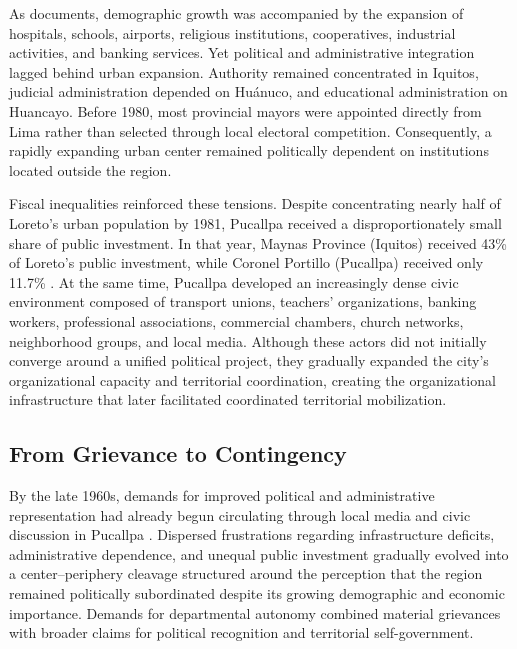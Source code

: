 \documentclass[12pt]{article}
\begin{document}
As \textcite{vivanco_pimentel_gran_1997} documents, demographic growth was accompanied by the expansion of hospitals, schools, airports, religious institutions, cooperatives, industrial activities, and banking services. Yet political and administrative integration lagged behind urban expansion. Authority remained concentrated in Iquitos, judicial administration depended on Huánuco, and educational administration on Huancayo. Before 1980, most provincial mayors were appointed directly from Lima rather than selected through local electoral competition. Consequently, a rapidly expanding urban center remained politically dependent on institutions located outside the region.

Fiscal inequalities reinforced these tensions. Despite concentrating nearly half of Loreto’s urban population by 1981, Pucallpa received a disproportionately small share of public investment. In that year, Maynas Province (Iquitos) received 43\% of Loreto’s public investment, while Coronel Portillo (Pucallpa) received only 11.7\% \parencite{vivanco_pimentel_gran_1997}. At the same time, Pucallpa developed an increasingly dense civic environment composed of transport unions, teachers’ organizations, banking workers, professional associations, commercial chambers, church networks, neighborhood groups, and local media. Although these actors did not initially converge around a unified political project, they gradually expanded the city’s organizational capacity and territorial coordination, creating the organizational infrastructure that later facilitated coordinated territorial mobilization.

\subsection{From Grievance to Contingency}\label{cleavage}

By the late 1960s, demands for improved political and administrative representation had already begun circulating through local media and civic discussion in Pucallpa \parencite{matos_tuesta_apuntes_2005}. Dispersed frustrations regarding infrastructure deficits, administrative dependence, and unequal public investment gradually evolved into a center--periphery cleavage structured around the perception that the region remained politically subordinated despite its growing demographic and economic importance. Demands for departmental autonomy combined material grievances with broader claims for political recognition and territorial self-government.
\end{document}
